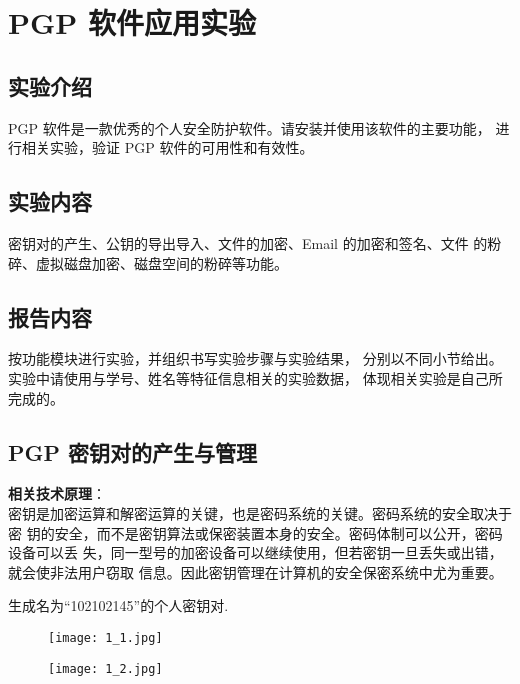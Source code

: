 \documentclass[../main.tex]{subfiles}
\begin{document}
\chapter{PGP 软件应用实验}
\section{实验介绍}
PGP 软件是一款优秀的个人安全防护软件。请安装并使用该软件的主要功能，
进行相关实验，验证 PGP 软件的可用性和有效性。
%
\section{实验内容}
密钥对的产生、公钥的导出导入、文件的加密、Email 的加密和签名、文件
的粉碎、虚拟磁盘加密、磁盘空间的粉碎等功能。
%
\section{报告内容}
按功能模块进行实验，并组织书写实验步骤与实验结果，
分别以不同小节给出。实验中请使用与学号、姓名等特征信息相关的实验数据，
体现相关实验是自己所完成的。
\section{PGP 密钥对的产生与管理}
\textbf{相关技术原理}： \\
密钥是加密运算和解密运算的关键，也是密码系统的关键。密码系统的安全取决于密
钥的安全，而不是密钥算法或保密装置本身的安全。密码体制可以公开，密码设备可以丢
失，同一型号的加密设备可以继续使用，但若密钥一旦丢失或出错，就会使非法用户窃取
信息。因此密钥管理在计算机的安全保密系统中尤为重要。

生成名为``102102145''的个人密钥对.
\begin{figure}[H]
  \begin{center}
    \texttt{[image: 1\_1.jpg]}
  \end{center}
\end{figure}
\begin{figure}[H]
  \begin{center}
    \texttt{[image: 1\_2.jpg]}
  \end{center}
\end{figure}
\end{document}
